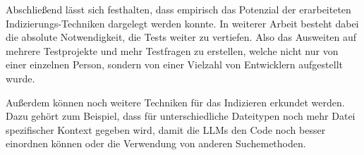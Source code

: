 \documentclass[../main.tex]{subfiles}
\begin{document}
Abschließend lässt sich festhalten, dass empirisch das Potenzial der erarbeiteten Indizierungs-Techniken dargelegt werden konnte.
In weiterer Arbeit besteht dabei die absolute Notwendigkeit, die Tests weiter zu vertiefen.
Also das Ausweiten auf mehrere Testprojekte und mehr Testfragen zu erstellen, welche nicht nur von einer einzelnen Person, sondern von einer Vielzahl von Entwicklern aufgestellt wurde.

Außerdem können noch weitere Techniken für das Indizieren erkundet werden.
Dazu gehört zum Beispiel, dass für unterschiedliche Dateitypen noch mehr Datei spezifischer Kontext gegeben wird, damit die \glspl{LLM} den Code noch besser einordnen können oder die Verwendung von anderen Suchemethoden.
\end{document}
